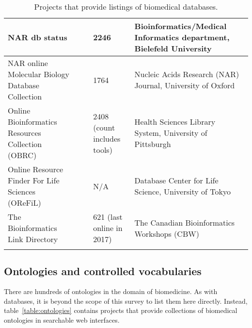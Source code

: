 \documentclass{article}
\begin{document}
\begin{landscape}
\begin{xltabular}{\textwidth}{p{5cm}|p{2.2cm}|p{2.2cm}|p{4cm}|p{6cm}}
\hline


NAR db status
&
\cite{nardbstatus_website}
&
\cite{nardbstatus_publication}
&
2246
&
Bioinformatics/Medical Informatics department,
Bielefeld University
\cite{nardbstatus_group}
\\


\hline


NAR online Molecular Biology Database Collection
&
\cite{nar_website}
&
\cite{nar_publication}
&
1764
&
Nucleic Acids Research (NAR) Journal,
University of Oxford
\cite{nar_group}
\\


\hline


Online Bioinformatics Resources Collection (OBRC)
&
\cite{obrc_website}
&
\cite{obrc_publication}
&
2408 (count includes tools)
&
Health Sciences Library System,
University of Pittsburgh
\cite{obrc_group}
\\


\hline


Online Resource Finder For Life Sciences (OReFiL)
&
\cite{orefil_website}
&
\cite{orefil_publication}
&
N/A
&
Database Center for Life Science,
University of Tokyo
\cite{orefil_group}
\\


\hline


The Bioinformatics Link Directory
&
\cite{tbld_website}
&
\cite{tbld_publication1}
\cite{tbld_publication2}
&
621 (last online in 2017)
&
The Canadian Bioinformatics Workshops (CBW)
\cite{tbld_group}
\\


\caption{Projects that provide listings of biomedical databases.}
\label{table:databases}
\end{xltabular}

\end{landscape}





\newpage
\subsection{Ontologies and controlled vocabularies}
\label{sec:ontologies}

There are hundreds of ontologies in the domain of biomedicine. As with databases, it is beyond the scope of this survey to list them here directly. Instead, table~\ref{table:ontologies} contains projects that provide collections of biomedical ontologies in searchable web interfaces.
\end{document}
